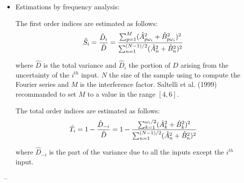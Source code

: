 {\begin{itemize}
  Output is computed such as:
  $y = f(s) = f(x_1(s), \dots, x_{n_X}(s))$

  Then $f(s)$ is expanded onto a Fourier series:
  \begin{displaymath}
    f(s) = \sum_{k \in \Zset^N} A_k \cos(ks) + B_k \sin(ks)
  \end{displaymath}

  where $A_k$ and $B_k$ are Fourier coefficients defined as follows:
  \begin{eqnarray*}
    A_k &=& \frac{1}{2\pi}\int_{-\pi}^{\pi}f(s) \cos(ks) \, ds \\
    B_k &=& \frac{1}{2\pi}\int_{-\pi}^{\pi}f(s) \sin(ks) \, ds
  \end{eqnarray*}

  These coefficients are estimated thanks to the following discrete formulations:
  \begin{eqnarray*}
    \hat{A}_k &=& \frac{1}{N} \sum_{j=1}^N f(x_j^1,\dots,x_j^{N_X}) cos \left( \frac{2k\pi (j-1)}{N} \right) \quad , \quad -\frac{N}{2} \leq k \leq \frac{N}{2}\\
    \hat{B}_k &=& \frac{1}{N} \sum_{j=1}^N f(x_j^1,\dots,x_j^{N_X}) sin \left( \frac{2k\pi (j-1)}{N} \right) \quad , \quad -\frac{N}{2} \leq k \leq \frac{N}{2}
  \end{eqnarray*}

  \item Estimations by frequency analysis:

  The first order indices are estimated as follows:
  \begin{displaymath}
    \hat{S}_i = \frac{\hat{D}_i}{\hat{D}} \\
              = \frac{\sum_{p=1}^M(\hat{A}_{p\omega_i}^2 + \hat{B}_{p\omega_i}^2)^2}
                     {\sum_{n=1}^{(N-1)/2}(\hat{A}_n^2 + \hat{B}_n^2)^2}
  \end{displaymath}

  where $\hat{D}$ is the total variance and $\hat{D}_i$ the portion of $D$ arising from the uncertainty of the $i^{th}$ input. $N$ the size of the sample using to compute the Fourier series and $M$ is the interference factor. Saltelli et al. (1999) recommanded to set $M$ to a value in the range $[4, 6]$.

  The total order indices are estimated as follows:
  \begin{displaymath}
    \hat{T}_i = 1 - \frac{\hat{D}_{-i}}{\hat{D}} \\
              = 1 - \frac{\sum_{k=1}^{\omega_i/2}(\hat{A}_k^2 + \hat{B}_k^2)^2}
                         {\sum_{n=1}^{(N-1)/2}(\hat{A}_n^2 + \hat{B}_n^2)^2}
  \end{displaymath}

  where $\hat{D}_{-i}$ is the part of the variance due to all the inputs except the $i^{th}$ input.
  \end{itemize}
}
{
  --}

